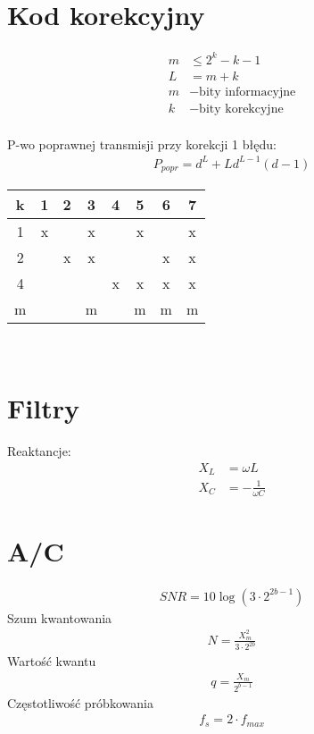 \documentclass[10pt,twocolumn,a4paper,fleqn]{article}
\begin{document}
\section{Kod korekcyjny}
\begin{align*}
	m &\le 2^k-k-1 \\
	L & = m+k \\
	m & - \text{bity informacyjne}\\
	k & - \text{bity korekcyjne}\\
\end{align*}

P-wo poprawnej transmisji przy korekcji 1 błędu:
\begin{align*}
	P_{popr} = d^L + Ld^{L-1}(d-1)
\end{align*}

\begin{tabular}{|c|c|c|c|c|c|c|c|}
\hline
k & 1 & 2 & 3 & 4 & 5 & 6 & 7 \\\hline
1 & x &   & x &   & x &   & x \\\hline
2 &   & x & x &   &   & x & x \\\hline
4 &   &   &   & x & x & x & x \\\hline
m &   &   & m &   & m & m & m \\\hline
\end{tabular}\\

\section{Filtry} 
Reaktancje:
\begin{align*}
	X_L & = \omega L\\
	X_C & = - \frac{1}{\omega C}
\end{align*}

\section{A/C} 
\begin{align*}
	SNR = 10 \log(3\cdot2^{2b-1})
\end{align*}
Szum kwantowania
\begin{align*}
	N = \frac{X_m^2}{3\cdot2^{2b}}
\end{align*}
Wartość kwantu
\begin{align*}
	q = \frac{X_m}{2^{b-1}}
\end{align*}
Częstotliwość próbkowania
\begin{align*}
	f_s = 2 \cdot f_{max}
\end{align*}
\end{document}
